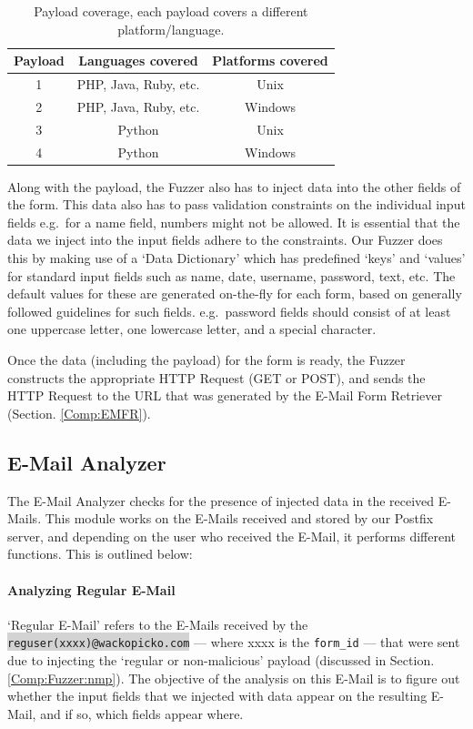 \begin{table}[!htbp]
	\centering
	\begin{tabular}{|c|c|c|}
		\hline
		\multicolumn{1}{|c|}{\textbf{Payload}} & \multicolumn{1}{c}{\textbf{Languages covered}} & \multicolumn{1}{|c|}{\textbf{Platforms covered}}\\
		\hline
		1 & PHP, Java, Ruby, etc. & Unix\\
		\hline
		2 & PHP, Java, Ruby, etc. & Windows\\
		\hline
		3 & Python & Unix\\
		\hline
		4 & Python & Windows\\
		\hline
	\end{tabular}
	\caption{Payload coverage, each payload covers a different platform/language.}
	\label{tab:payloadcov}
\end{table}
Along with the payload, the Fuzzer also has to inject data into the other fields of the form. This data also has to pass validation constraints on the individual input fields e.g.\ for a name field, numbers might not be allowed. It is essential that the data we inject into the input fields adhere to the constraints. Our Fuzzer does this by making use of a `Data Dictionary' which has predefined `keys' and `values' for standard input fields such as name, date, username, password, text, etc. The default values for these are generated on-the-fly for each form, based on generally followed guidelines for such fields. e.g.\ password fields should consist of at least one uppercase letter, one lowercase letter, and a special character.

Once the data (including the payload) for the form is ready, the Fuzzer constructs the appropriate HTTP Request (GET or POST), and sends the HTTP Request to the URL that was generated by the E-Mail Form Retriever (Section. \ref{Comp:EMFR}). 


\subsection{E-Mail Analyzer}
\label{Comp:EMA}
The E-Mail Analyzer checks for the presence of injected data in the received E-Mails. This module works on the E-Mails received and stored by our Postfix server, and depending on the user who received the E-Mail, it performs different functions. This is outlined below:
\paragraph{Analyzing Regular E-Mail}
`Regular E-Mail' refers to the E-Mails received by the \colorbox{lightgray}{\lstinline{reguser(xxxx)@wackopicko.com}} --- where xxxx is the \lstinline{form_id} --- that were sent due to injecting the `regular or non-malicious' payload (discussed in Section. \ref{Comp:Fuzzer:nmp}). The objective of the analysis on this E-Mail is to figure out whether the input fields that we injected with data appear on the resulting E-Mail, and if so, which fields appear where.

